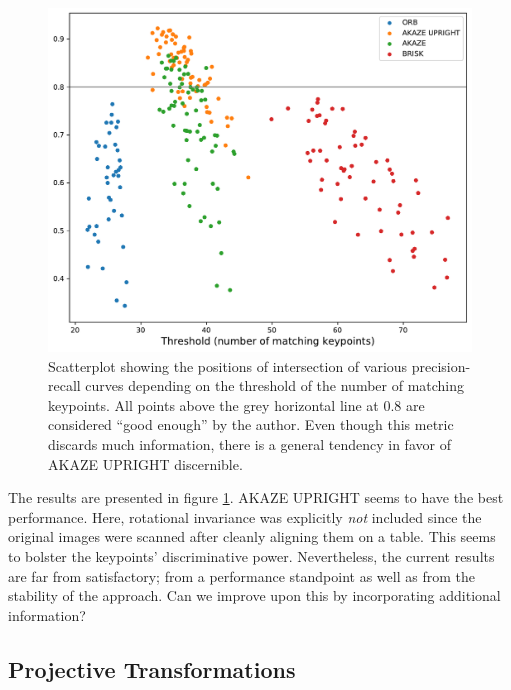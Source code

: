 \documentclass{ltjarticle}
\begin{document}
\begin{figure}
    \centering
    \includegraphics[width=\textwidth]{keypoint-evaluation.pdf}
    \caption[Scatterplot of keypoint performance]{Scatterplot showing the positions of intersection of various precision-recall curves depending on the threshold of the number of matching keypoints. All points above the grey horizontal line at $0.8$ are considered “good enough” by the author. Even though this metric discards much information, there is a general tendency in favor of AKAZE UPRIGHT discernible.}
    \label{fig:keypoint-evaluation}
\end{figure}

The results are presented in figure \ref{fig:keypoint-evaluation}. AKAZE UPRIGHT seems to have the best performance. Here, rotational invariance was explicitly \emph{not} included since the original images were scanned after cleanly aligning them on a table. This seems to bolster the keypoints' discriminative power. Nevertheless, the current results are far from satisfactory; from a performance standpoint as well as from the stability of the approach. Can we improve upon this by incorporating additional information?

\subsection{Projective Transformations}
\label{sec:projective-transformations}
\end{document}
